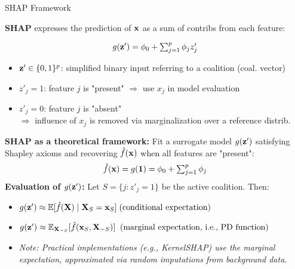 \documentclass[10pt,compress,t,notes=noshow, xcolor=table]{beamer}
\begin{document}
\begin{frame}{SHAP Framework }

\textbf{SHAP} expresses the prediction of $\mathbf{x}$ as a sum of contribs from each feature:

\[
g(\mathbf{z}') = \phi_0 + \textstyle\sum_{j=1}^p \phi_j z'_j
\]

\begin{itemize}
  \item $\mathbf{z}' \in \{0,1\}^p$: simplified binary input referring to a coalition (coal. vector)
  \item \(z'_j = 1\): feature $j$ is "present" $\Rightarrow$ use $x_j$ in model evaluation
  \item \(z'_j = 0\): feature $j$ is "absent"\\$\Rightarrow$ influence of $x_j$ is removed via marginalization over a reference distrib.%
\end{itemize}

\pause\medskip

\textbf{SHAP as a theoretical framework:} Fit a surrogate model \( g(\mathbf{z}') \) satisfying Shapley axioms and recovering $\hat{f}(\mathbf{x})$ when all features are "present":
\[
\hat{f}(\mathbf{x}) = g(\mathbf{1}) = \phi_0 + \textstyle\sum_{j=1}^p \phi_j
\]
\textbf{Evaluation of $g(\mathbf{z}')$:} Let \( S = \{ j : z'_j = 1 \} \) be the active coalition. Then:
\begin{itemize}
    \item $g(\mathbf{z}') \approx \mathbb{E}[ \hat{f}(\mathbf{X}) \mid \mathbf{X}_S = \mathbf{x}_S]\;\text{(conditional expectation)}$
    \item $g(\mathbf{z}') \approx \mathbb{E}_{\mathbf{X}_{-S}} [ \hat{f}(\mathbf{x}_S, \mathbf{X}_{-S}) ] \;\;\text{(marginal expectation, i.e., PD function)}$
    \item\textit{Note: Practical implementations (e.g., KernelSHAP) use the marginal expectation, approximated via random imputations from background data.}
\end{itemize}

\end{frame}


\end{document}
